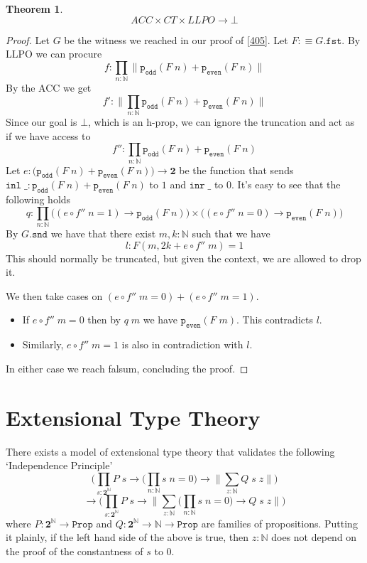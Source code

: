 \documentclass[12pt]{report}
\newtheorem{thm}{Theorem}[section]
\begin{document}
\begin{thm}
$$ACC \times CT \times LLPO \rightarrow \bot$$
\end{thm}
\begin{proof}
Let $G$ be the witness we reached in our proof of \cref{405}. 
Let $F :\equiv G.\mathtt{fst}$. 
By LLPO we can procure 
$$f : \prod_{n : \mathbb{N}} \lVert \mathtt{p_{odd}}(F\; n) + \mathtt{p_{even}}(F\;n) \rVert$$
By the ACC we get
$$f' : \big\lVert \prod_{n : \mathbb{N}}  \mathtt{p_{odd}}(F\; n) + \mathtt{p_{even}}(F\;n) \big\rVert$$
Since our goal is $\bot$, which is an h-prop, we can ignore the truncation and act as if we have access to
$$f'' : \prod_{n : \mathbb{N}}  \mathtt{p_{odd}}(F\; n) + \mathtt{p_{even}}(F\;n)$$
Let $e : \big( \mathtt{p_{odd}}(F\; n) + \mathtt{p_{even}}(F\;n)\big) \rightarrow \mathbf{2}$ be the function that sends $\mathtt{inl}\; \_ : \mathtt{p_{odd}}(F\; n) + \mathtt{p_{even}}(F\;n)$
to $1$ and $\mathtt{inr}\; \_$ to $0$. 
It's easy to see that the following holds
$$q : \prod_{n : \mathbb{N}} \big( (e\circ f''\; n = 1) \rightarrow \mathtt{p_{odd}}(F\; n) \big) \times \big( (e\circ f''\; n = 0) \rightarrow \mathtt{p_{even}}(F\; n) \big)$$
By $G.\mathtt{snd}$ we have that there exist $m,k : \mathbb{N}$ such that we have 
$$l : F(m, 2k + e\circ f''\; m) = 1$$
This should normally be truncated, but given the context, we are allowed to drop it. 

We then take cases on $(e\circ f''\; m = 0) + (e\circ f''\; m = 1)$. 
\begin{itemize}
	\item If $e\circ f''\; m = 0$ then by $q\; m$ we have $\mathtt{p_{even}}(F\; m)$. 
	This contradicts $l$. 
	\item Similarly, $e\circ f''\; m = 1$ is also in contradiction with $l$.
\end{itemize}
In either case we reach falsum, concluding the proof.
\end{proof}

\chapter{Extensional Type Theory}
There exists a model of extensional type theory that validates the following `Independence Principle'
$$\bigg( \prod_{s : \mathbf{2}^\mathbb{N}} P\; s \rightarrow \Big(\prod_{n : \mathbb{N}}s\; n = 0 \Big) \rightarrow \Big\lVert \sum_{z : \mathbb{N}} Q\; s\; z\Big\rVert \bigg)$$
$$\rightarrow \bigg( \prod_{s : \mathbf{2}^\mathbb{N}} P\; s \rightarrow  \Big\lVert \sum_{z:\mathbb{N}} \Big(\prod_{n : \mathbb{N}}s\; n = 0 \Big) \rightarrow Q \; s\;z\Big\rVert \bigg)$$
where $P: \mathbf{2}^\mathbb{N} \rightarrow \mathtt{Prop}$ and $Q : \mathbf{2}^\mathbb{N} \rightarrow \mathbb{N}\rightarrow \mathtt{Prop} $ are families of propositions. 
Putting it plainly, if the left hand side of the above is true, then $z : \mathbb{N}$ does not depend on the proof of the constantness of $s$ to $0$.
\end{document}
